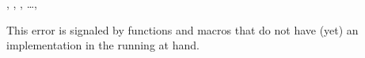 \documentclass[../Comparisons-Predicates.tex]{subfiles}
\begin{document}
  
  \DSupertypes{}
  
  , ,
  , \ldots, 
  
  \DDescription{}
  
  This error is signaled by functions and macros that do not have (yet)
  an implementation in the running \CL{} at hand.
  
\end{document}
